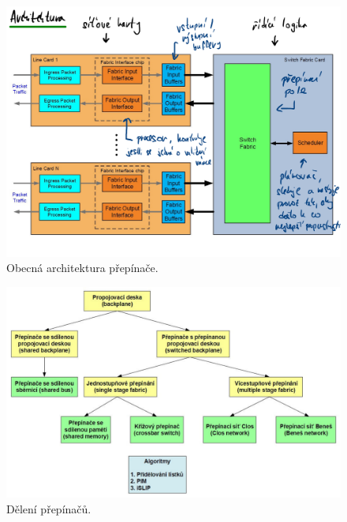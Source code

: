 \begin{figure}[H]
    \centering
    \includegraphics[width=1\linewidth]{obecna_architektura.pdf}
    \caption{Obecná architektura přepínače.}
    \label{pds_obecna_architektura_prepinace}
\end{figure}

\begin{figure}[H]
    \centering
    \includegraphics[width=1\linewidth]{deleni_prepinacu.pdf}
    \caption{Dělení přepínačů.}
\end{figure}

